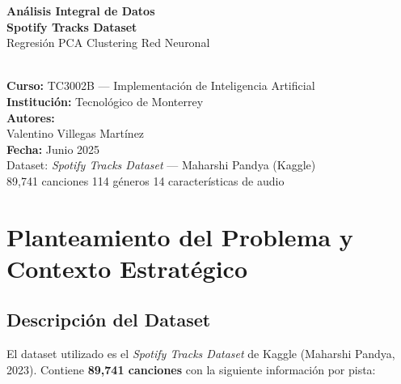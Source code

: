 \documentclass[12pt,a4paper]{article}
\begin{document}
\begin{titlepage}
\centering
\vspace*{1.8cm}
{\Huge\bfseries\color{spotdark} An\'alisis Integral de Datos\\[0.4em]
{\color{spotgreen} Spotify Tracks Dataset}}\\[1.2cm]
{\large\color{spotgray}
  Regresi\'on \textbullet{} PCA \textbullet{} Clustering \textbullet{} Red Neuronal}\\[0.6cm]
\\[1.8cm]
{\large\textbf{Curso:} TC3002B --- Implementaci\'on de Inteligencia Artificial}\\[0.4em]
{\large\textbf{Instituci\'on:} Tecnol\'ogico de Monterrey}\\[2cm]
{\large\textbf{Autores:}}\\[0.5em]
{\large Valentino Villegas Mart\'inez}\\[2.5cm]
{\large\textbf{Fecha:} Junio 2025}\\[1cm]
\vfill
{\small\color{spotgray}
  Dataset: \textit{Spotify Tracks Dataset} --- Maharshi Pandya (Kaggle)\\
  89{,}741 canciones \textbullet{} 114 g\'eneros \textbullet{} 14 caracter\'isticas de audio
}
\end{titlepage}

\tableofcontents
\newpage

\section{Planteamiento del Problema y Contexto Estrat\'egico}

\subsection{Descripci\'on del Dataset}

El dataset utilizado es el \textit{Spotify Tracks Dataset} de Kaggle (Maharshi Pandya, 2023).
Contiene \textbf{89{,}741 canciones} con la siguiente informaci\'on por pista:
\end{document}
